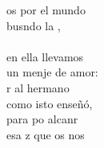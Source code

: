 \begin{cancion}%
	os por el mundo\\
	busndo la ,\\
	\jump\\
en ella llevamos\\
	un menje de amor:\\
	r al hermano\\
	como isto enseñó,\\
	para po alcanr\\
	esa z que os nos \\
\end{cancion}%
